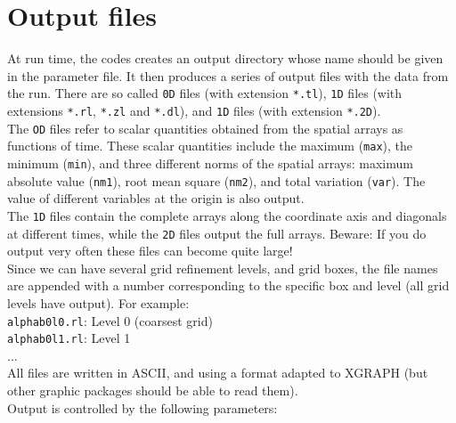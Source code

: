 \documentclass[12pt]{article}
\begin{document}

\section{Output files}

At run time, the codes creates an output directory whose name should
be given in the parameter file. It then produces a series of output
files with the data from the run. There are so called \texttt{0D}
files (with extension \texttt{*.tl}), \texttt{1D} files (with
extensions \texttt{*.rl}, \texttt{*.zl} and \texttt{*.dl}), and
\texttt{1D} files (with extension \texttt{*.2D}). \\

The \texttt{OD} files refer to scalar quantities obtained from the
spatial arrays as functions of time. These scalar quantities include
the maximum (\texttt{max}), the minimum (\texttt{min}), and three
different norms of the spatial arrays: maximum absolute value
(\texttt{nm1}), root mean square (\texttt{nm2}), and total variation
(\texttt{var}). The value of different variables at the origin is also
output. \\

The \texttt{1D} files contain the complete arrays along the coordinate
axis and diagonals at different times, while the \texttt{2D} files
output the full arrays.  Beware: If you do output very often these
files can become quite large! \\

Since we can have several grid refinement levels, and grid boxes,
the file names are appended with a number corresponding to the specific
box and level (all grid levels have output). For example: \\

\texttt{alphab0l0.rl}: \hspace{5mm} Level 0 (coarsest grid) \\
\texttt{alphab0l1.rl}: \hspace{5mm} Level 1 \\
... \\

All files are written in ASCII, and using a format adapted to XGRAPH
(but other graphic packages should be able to read them).\\

Output is controlled by the following parameters:
\end{document}
